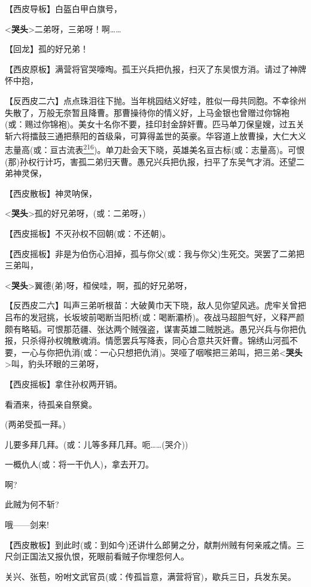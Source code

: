 【西皮导板】白盔白甲白旗号，

\textless{}\textbf{哭头}\textgreater{}二弟呀，三弟呀！啊\ldots{}\ldots{}

【回龙】孤的好兄弟！

【西皮原板】满营将官哭嚎啕。孤王兴兵把仇报，扫灭了东吴恨方消。请过了神牌怀中抱，

【反西皮二六】点点珠泪往下抛。当年桃园结义好哇，胜似一母共同胞。不幸徐州失散了，万般无奈暂且降曹。那曹操待你的情义好，上马金银也曾赠过你锦袍(或：赐过你锦袍)。美女十名你不要，挂印封金辞奸曹。匹马单刀保皇嫂，过五关斩六将擂鼓三通把蔡阳的首级枭，可算得盖世的英豪。华容道上放曹操，大仁大义志量高(或：亘古流表\protect\hyperlink{fn216}{\textsuperscript{216}})。单刀赴会天下晓，英雄美名亘古标(或：志量高)。可恨(那)孙权行计巧，害孤二弟归天曹。愚兄兴兵把仇报，扫平了东吴气才消。还望二弟神灵保，

【西皮散板】神灵呐保，

\textless{}\textbf{哭头}\textgreater{}孤的好兄弟呀，(或：二弟呀，)

【西皮摇板】不灭孙权不回朝(或：不还朝)。

【西皮摇板】非是为伯伤心泪掉，孤与你父(或：我与你父)生死交。哭罢了二弟把三弟叫，

\textless{}\textbf{哭头}\textgreater{}翼德(弟)呀，桓侯哇，啊，孤的好兄弟呀，

【反西皮二六】叫声三弟听根苗：大破黄巾天下晓，敌人见你望风逃。虎牢关曾把吕布的发冠挑，长坂坡前喝断当阳桥(或：喝断灞桥)。夜战马超胆气好，义释严颜颇有略韬。可恨那范疆、张达两个贼强盗，谋害英雄二贼脱逃。愚兄兴兵与你把仇报，只杀得孙权魄散魂消。情愿罢兵写降表，同心合意共灭奸曹。锦绣山河孤不要，一心与你把仇消(或：一心只想把仇消)。哭哑了咽喉把三弟叫，把三弟\textless{}\textbf{哭头}\textgreater{}叫，豹头环眼的三弟呀，

【西皮摇板】拿住孙权两开销。

看酒来，待孤亲自祭奠。

(两弟受孤一拜。)

儿要多拜几拜。(或：儿等多拜几拜。呃\ldots{}\ldots{}(哭介))

一概仇人(或：将一干仇人)，拿去开刀。

啊?

此贼为何不斩?

哦------剑来!

【西皮散板】到此时(或：到如今)还讲什么郎舅之分，献荆州贼有何亲戚之情。三尺剑正国法又报仇恨，死眼前看贼子你埋怨何人。

关兴、张苞，吩咐文武官员(或：传孤旨意，满营将官)，歇兵三日，兵发东吴。

